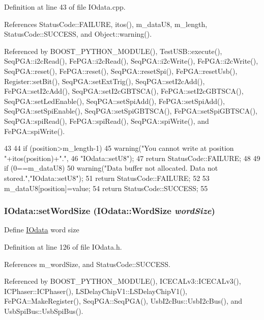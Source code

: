 Definition at line 43 of file IOdata.cpp.

References StatusCode::FAILURE, itos(), m\_\-dataU8, m\_\-length, StatusCode::SUCCESS, and Object::warning().

Referenced by BOOST\_\-PYTHON\_\-MODULE(), TestUSB::execute(), SeqPGA::i2cRead(), FePGA::i2cRead(), SeqPGA::i2cWrite(), FePGA::i2cWrite(), SeqPGA::reset(), FePGA::reset(), SeqPGA::resetSpi(), FePGA::resetUsb(), Register::setBit(), SeqPGA::setExtTrig(), SeqPGA::setI2cAdd(), FePGA::setI2cAdd(), SeqPGA::setI2cGBTSCA(), FePGA::setI2cGBTSCA(), SeqPGA::setLedEnable(), SeqPGA::setSpiAdd(), FePGA::setSpiAdd(), SeqPGA::setSpiEnable(), SeqPGA::setSpiGBTSCA(), FePGA::setSpiGBTSCA(), SeqPGA::spiRead(), FePGA::spiRead(), SeqPGA::spiWrite(), and FePGA::spiWrite().


\begin{DoxyCode}
43                                                             {
44   if (position>m_length-1){
45     warning("You cannot write at position "+itos(position)+".",
46         "IOdata::setU8");
47     return StatusCode::FAILURE;
48   }
49   if (0==m_dataU8){
50     warning("Data buffer not allocated. Data not stored.","IOdata::setU8");
51     return StatusCode::FAILURE;
52   }
53   m_dataU8[position]=value;
54   return StatusCode::SUCCESS;
55 }
\end{DoxyCode}
\hypertarget{classIOdata_a20f30a9f4673713616447b1b5e9817d5}{
\subsubsection[{setWordSize}]{ IOdata::setWordSize ({\bf IOdata::WordSize} {\em wordSize})}}
\label{classIOdata_a20f30a9f4673713616447b1b5e9817d5}
Define \hyperlink{classIOdata}{IOdata} word size 

Definition at line 126 of file IOdata.h.

References m\_\-wordSize, and StatusCode::SUCCESS.

Referenced by BOOST\_\-PYTHON\_\-MODULE(), ICECALv3::ICECALv3(), ICPhaser::ICPhaser(), LSDelayChipV1::LSDelayChipV1(), FePGA::MakeRegister(), SeqPGA::SeqPGA(), UsbI2cBus::UsbI2cBus(), and UsbSpiBus::UsbSpiBus().


